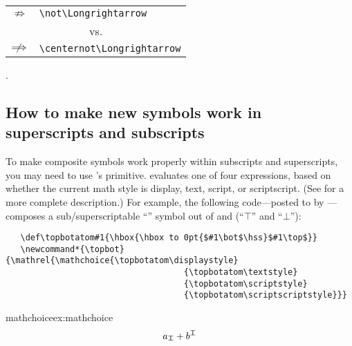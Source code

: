 \ifhavecenternot
   \begin{center}
    \renewcommand{\arraystretch}{1.25}%
    \begin{tabular}{cl}
      $\not\Longrightarrow$       & \verb|\not\Longrightarrow| \\
      \multicolumn{2}{c}{vs.} \\
      $\centernot\Longrightarrow$ & \verb|\centernot\Longrightarrow| \\
    \end{tabular}
  \end{center}
\else
  .
\fi   
{}


\subsection{How to make new symbols work in superscripts and subscripts}



To make composite symbols work properly within subscripts and
superscripts, you may need to use \tex's \cmd{\mathchoice} primitive.
\cmd{\mathchoice} evaluates one of four expressions, based on whether
the current math style is display, text, script, or scriptscript.
(See \TeXbook for a more complete description.)  For example, the
following \latex code---posted to \ctt by
---composes a sub/superscriptable
``\cmd{\topbot}'' symbol out of \cmdX{\top} and \cmdX{\bot} (``$\top$''
and ``$\bot$''):



\indexcommand{\displaystyle}%
\indexcommand{\textstyle}%
\indexcommand{\scriptstyle}%
\indexcommand{\scriptscriptstyle}%
\label{code:topbot}%

\begin{verbatim}
   \def\topbotatom#1{\hbox{\hbox to 0pt{$#1\bot$\hss}$#1\top$}}
   \newcommand*{\topbot}{\mathrel{\mathchoice{\topbotatom\displaystyle}
                                    {\topbotatom\textstyle}
                                    {\topbotatom\scriptstyle}
                                    {\topbotatom\scriptscriptstyle}}}
\end{verbatim}

\begin{texexample}{mathchoice}{ex:mathchoice}
\bgroup
\def\topbotatom#1{\hbox{\hbox to 0pt{$#1\bot$\hss}$#1\top$}}
   \newcommand*{\topbot}{\mathrel{\mathchoice{\topbotatom\displaystyle}
                                    {\topbotatom\textstyle}
                                    {\topbotatom\scriptstyle}
                                    {\topbotatom\scriptscriptstyle}}}
\[ a_{\topbot} + b^{\topbot} \]
\egroup
\end{texexample}


